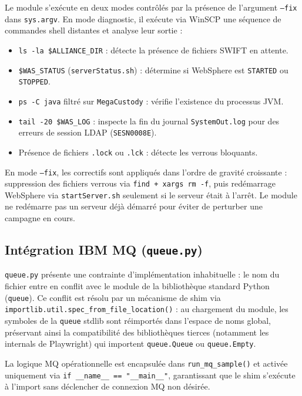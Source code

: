\documentclass[12pt, a4paper]{report}
\begin{document}
Le module s'exécute en deux modes contrôlés par la présence de l'argument \texttt{--fix} dans \texttt{sys.argv}. En mode diagnostic, il exécute via WinSCP une séquence de commandes shell distantes et analyse leur sortie :

\begin{itemize}
  \item \texttt{ls -la \$ALLIANCE\_DIR} : détecte la présence de fichiers SWIFT en attente.
  \item \texttt{\$WAS\_STATUS} (\texttt{serverStatus.sh}) : détermine si WebSphere est \texttt{STARTED} ou \texttt{STOPPED}.
  \item \texttt{ps -C java} filtré sur \texttt{MegaCustody} : vérifie l'existence du processus JVM.
  \item \texttt{tail -20 \$WAS\_LOG} : inspecte la fin du journal \texttt{SystemOut.log} pour des erreurs de session LDAP (\texttt{SESN0008E}).
  \item Présence de fichiers \texttt{.lock} ou \texttt{.lck} : détecte les verrous bloquants.
\end{itemize}

En mode \texttt{--fix}, les correctifs sont appliqués dans l'ordre de gravité croissante : suppression des fichiers verrous via \texttt{find + xargs rm -f}, puis redémarrage WebSphere via \texttt{startServer.sh} seulement si le serveur était à l'arrêt. Le module ne redémarre pas un serveur déjà démarré pour éviter de perturber une campagne en cours.

\subsection{Intégration IBM MQ (\texttt{queue.py})}

\texttt{queue.py} présente une contrainte d'implémentation inhabituelle : le nom du fichier entre en conflit avec le module de la bibliothèque standard Python (\texttt{queue}). Ce conflit est résolu par un mécanisme de shim via \texttt{importlib.util.spec\_from\_file\_location()} : au chargement du module, les symboles de la \texttt{queue} stdlib sont réimportés dans l'espace de noms global, préservant ainsi la compatibilité des bibliothèques tierces (notamment les internals de Playwright) qui importent \texttt{queue.Queue} ou \texttt{queue.Empty}.

La logique MQ opérationnelle est encapsulée dans \texttt{run\_mq\_sample()} et activée uniquement via \texttt{if \_\_name\_\_ == "\_\_main\_\_"}, garantissant que le shim s'exécute à l'import sans déclencher de connexion MQ non désirée.
\end{document}
